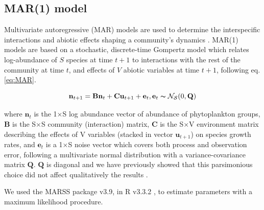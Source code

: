\documentclass[9pt,twocolumn,twoside,lineno]{pnas-new}
\begin{document}
{\subsection*{MAR(1) model}

Multivariate autoregressive (MAR) models are used to determine the
interspecific interactions and abiotic effects shaping a community's
dynamics \cite{ives_estimating_2003}. MAR(1) models are based
on a stochastic, discrete-time Gompertz model which relates log-abundance
of $S$ species at time $t+1$ to interactions with the rest of the
community at time $t$, and effects of $V$ abiotic variables at time
$t+1$, following eq. \ref{eq:MAR}.

\begin{equation}
\mathbf{n}_{t+1}=\mathbf{B}\mathbf{n}_{t}+\textbf{C}\textbf{u}_{t+1}+\mathbf{e}_{t},\mathbf{e}_{t}\thicksim\mathcal{{N_{S}}}(0,\mathbf{Q})\label{eq:MAR}
\end{equation}

where $\mathbf{n}_{\ensuremath{t}}$ is the 1$\times$S log abundance
vector of abundance of phytoplankton groups, $\mathbf{B}$ is the
S$\times$S community (interaction) matrix, $\mathbf{C}$ is the S$\times$V
environment matrix describing the effects of V variables (stacked
in vector $\mathbf{u}_{t+1}$) on species growth rates, and $\mathbf{e}_{t}$
is a 1$\times$S noise vector which covers both process and observation
error, following a multivariate normal distribution with a variance-covariance
matrix $\mathbf{Q}$. $\mathbf{Q}$ is diagonal and we have previously
showed that this parsimonious choice did not affect qualitatively
the results \cite{barraquand_coastal_2018}.

We used the MARSS package \cite{holmes_analysis_2014} v3.9, in
R v3.3.2 \cite{venables_r_2013}, to estimate parameters with
a maximum likelihood procedure.

}
\end{document}

